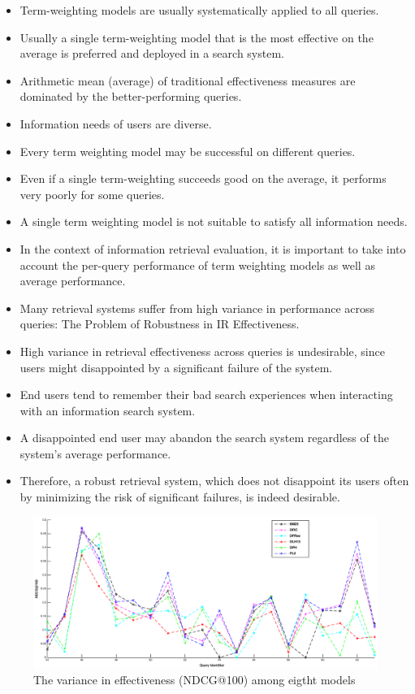 \begin{itemize}
  \item Term-weighting models are usually systematically applied to all queries.
  \item Usually a single term-weighting model that is the most effective on the average is preferred and deployed in a search system.
  \item Arithmetic mean (average) of traditional effectiveness measures are dominated by the better-performing queries.
  \item Information needs of users are diverse.
  \item Every term weighting model may be successful on different queries.
  \item Even if a single term-weighting succeeds good on the average, it performs very poorly for some queries.
  \item A single term weighting model is not suitable to satisfy all information needs.
  \item In the context of information retrieval evaluation, it is important to take into account the per-query performance of term weighting models as well as average performance.
  \item Many retrieval systems suffer from high variance in performance across queries: The Problem of Robustness in IR Effectiveness.
  \item High variance in retrieval effectiveness across queries is undesirable, since users might disappointed by a significant failure of the system.
  \item End users tend to remember their bad search experiences when interacting with an information search system. 
  \item A disappointed end user may abandon the search system regardless of the system's average performance.
  \item Therefore, a robust retrieval system, which does not disappoint its users often by minimizing the risk of significant failures, is indeed desirable.
\end{itemize}

\begin{figure}[!t]
\centering
\includegraphics[width=\textwidth]{variance.eps}
\caption{The variance in effectiveness (NDCG@100) among eigtht models}
\label{fig1}
\end{figure}


